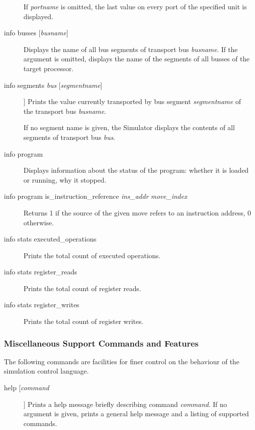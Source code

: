 \documentclass[twoside]{tceusermanual}
\begin{document}
\begin{description}
  If \emph{portname} is omitted, the last value on every port of the
  specified unit is displayed.

\item[info busses {[\emph{busname}]}] %
  Displays the name of all bus segments of transport bus \emph{busname}.  If
  the argument is omitted, displays the name of the segments of all busses
  of the target processor.%

\item[info segments \emph{bus} {[\emph{segmentname}]}]] %
  Prints the value currently transported by bus segment \emph{segmentname}
  of the transport bus \emph{busname}.

  If no segment name is given, the Simulator displays the contents of all
  segments of transport bus \emph{bus}.

\item[info program] %
  Displays information about the status of the program: whether it is
  loaded or running, why it stopped.

\item[info program is\_instruction\_reference \emph{ins\_addr} \emph{move\_index}]
  Returns 1 if the source of the given move refers to an instruction
  address, 0 otherwise.

\item[info stats executed\_operations] %
  Prints the total count of executed operations.

\item[info stats register\_reads] %
  Prints the total count of register reads.

\item[info stats register\_writes] %
  Prints the total count of register writes.

\end{description}

\subsubsection{Miscellaneous Support Commands and Features}
\label{ssec:debug-misc}

The following commands are facilities for finer control on the behaviour of
the simulation control language.

\begin{description}
\item[help [\emph{command}]] %
  Prints a help message briefly describing command \emph{command}.
 If no argument is given, prints a general help message and a listing of
 supported commands.
\end{description}
\end{document}
